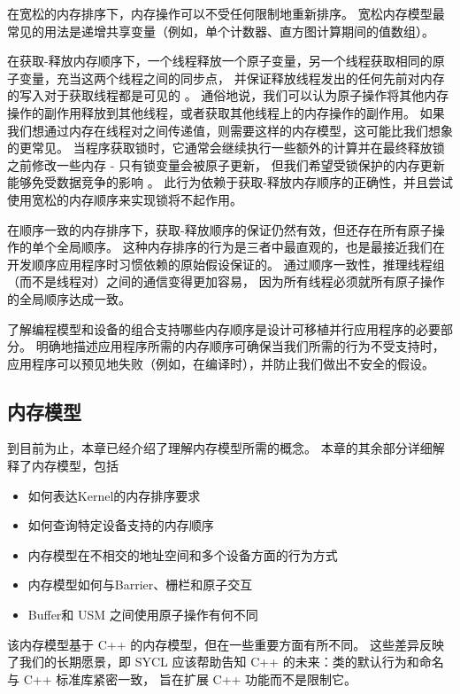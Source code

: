 在宽松的内存排序下，内存操作可以不受任何限制地重新排序。 
宽松内存模型最常见的用法是递增共享变量（例如，单个计数器、直方图计算期间的值数组）。

在获取-释放内存顺序下，一个线程释放一个原子变量，另一个线程获取相同的原子变量，充当这两个线程之间的同步点，
并保证释放线程发出的任何先前对内存的写入对于获取线程都是可见的 。 
通俗地说，我们可以认为原子操作将其他内存操作的副作用释放到其他线程，或者获取其他线程上的内存操作的副作用。 
如果我们想通过内存在线程对之间传递值，则需要这样的内存模型，这可能比我们想象的更常见。 
当程序获取锁时，它通常会继续执行一些额外的计算并在最终释放锁之前修改一些内存 - 只有锁变量会被原子更新，
但我们希望受锁保护的内存更新能够免受数据竞争的影响 。 
此行为依赖于获取-释放内存顺序的正确性，并且尝试使用宽松的内存顺序来实现锁将不起作用。

在顺序一致的内存排序下，获取-释放顺序的保证仍然有效，但还存在所有原子操作的单个全局顺序。 
这种内存排序的行为是三者中最直观的，也是最接近我们在开发顺序应用程序时习惯依赖的原始假设保证的。 
通过顺序一致性，推理线程组（而不是线程对）之间的通信变得更加容易，
因为所有线程必须就所有原子操作的全局顺序达成一致。

了解编程模型和设备的组合支持哪些内存顺序是设计可移植并行应用程序的必要部分。 
明确地描述应用程序所需的内存顺序可确保当我们所需的行为不受支持时，
应用程序可以预见地失败（例如，在编译时），并防止我们做出不安全的假设。

\subsection{内存模型}
到目前为止，本章已经介绍了理解内存模型所需的概念。 本章的其余部分详细解释了内存模型，包括

\begin{itemize}
	\item 如何表达Kernel的内存排序要求

	\item 如何查询特定设备支持的内存顺序

	\item 内存模型在不相交的地址空间和多个设备方面的行为方式

	\item 内存模型如何与Barrier、栅栏和原子交互

	\item Buffer和 USM 之间使用原子操作有何不同
\end{itemize}

该内存模型基于 C++ 的内存模型，但在一些重要方面有所不同。 
这些差异反映了我们的长期愿景，即 SYCL 应该帮助告知 C++ 的未来：类的默认行为和命名与 C++ 标准库紧密一致，
旨在扩展 C++ 功能而不是限制它。

